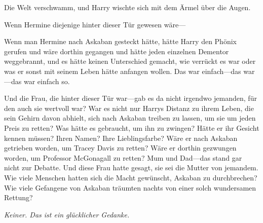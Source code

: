Die Welt verschwamm, und Harry wischte sich mit dem Ärmel über die Augen.

Wenn Hermine diejenige hinter dieser Tür gewesen wäre—

Wenn man Hermine nach Askaban gesteckt hätte, hätte Harry den Phönix gerufen und wäre dorthin gegangen und hätte jeden einzelnen Dementor weggebrannt, und es hätte keinen Unterschied gemacht, wie verrückt es war oder was er sonst mit seinem Leben hätte anfangen wollen. Das war einfach—das war—das war einfach so.

Und die Frau, die hinter dieser Tür war—gab es da nicht irgendwo jemanden, für den auch sie wertvoll war? War es nicht nur Harrys Distanz zu ihrem Leben, die sein Gehirn davon abhielt, sich nach Askaban treiben zu lassen, um sie um jeden Preis zu retten? Was hätte es gebraucht, um ihn zu zwingen? Hätte er ihr Gesicht kennen müssen? Ihren Namen? Ihre Lieblingsfarbe? Wäre er nach Askaban getrieben worden, um Tracey Davis zu retten? Wäre er dorthin gezwungen worden, um Professor McGonagall zu retten? Mum und Dad—das stand gar nicht zur Debatte. Und diese Frau hatte gesagt, sie sei die Mutter von jemandem. Wie viele Menschen hatten sich die Macht gewünscht, Askaban zu durchbrechen? Wie viele Gefangene von Askaban träumten nachts von einer solch wundersamen Rettung?

\emph{Keiner. Das ist ein glücklicher Gedanke.}

